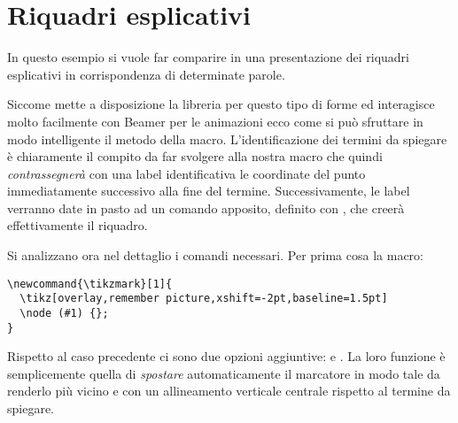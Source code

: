 \section{Riquadri esplicativi}

In questo esempio si vuole far comparire in una presentazione dei riquadri esplicativi in corrispondenza di determinate parole. 

Siccome \Tikz{} mette a disposizione la libreria  per questo tipo di forme ed interagisce molto facilmente con Beamer per le animazioni ecco come si può sfruttare in modo intelligente il metodo della  macro. L'identificazione dei termini da spiegare è chiaramente il compito da far svolgere alla nostra  macro che quindi \emph{contrassegnerà} con una label identificativa le coordinate del punto immediatamente successivo alla fine del termine. Successivamente, le label verranno date in pasto ad un comando apposito, definito con \Tikz{}, che creerà effettivamente il riquadro.

Si analizzano ora nel dettaglio i comandi necessari. Per prima cosa la  macro:
\begin{lstlisting}[frame=lines]
\newcommand{\tikzmark}[1]{
  \tikz[overlay,remember picture,xshift=-2pt,baseline=1.5pt] 
  \node (#1) {};
}
\end{lstlisting}
Rispetto al caso precedente ci sono due opzioni aggiuntive:  e . La loro funzione è semplicemente quella di \emph{spostare} automaticamente il marcatore in modo tale da renderlo più vicino e con un allineamento verticale centrale rispetto al termine da spiegare.

